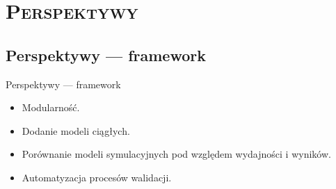 \section{\scshape Perspektywy}

\subsection{Perspektywy --- framework}
\begin{frame}{Perspektywy --- framework}
  \begin{itemize}
    \item Modularność.
    \item Dodanie modeli ciągłych.
    \item Porównanie modeli symulacyjnych pod względem wydajności i wyników.
    \item Automatyzacja procesów walidacji.
  \end{itemize}
\end{frame}